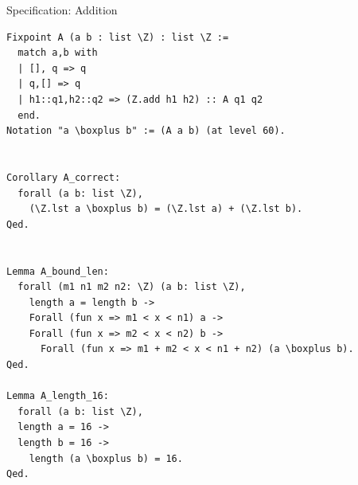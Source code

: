 \documentclass[8pt]{beamer}
\begin{document}
%
%

\begin{frame}[fragile]{Specification: Addition}
  \begin{center}
\begin{lstlisting}[language=Coq]
Fixpoint A (a b : list \Z) : list \Z :=
  match a,b with
  | [], q => q
  | q,[] => q
  | h1::q1,h2::q2 => (Z.add h1 h2) :: A q1 q2
  end.
Notation "a \boxplus b" := (A a b) (at level 60).


Corollary A_correct:
  forall (a b: list \Z),
    (\Z.lst a \boxplus b) = (\Z.lst a) + (\Z.lst b).
Qed.


Lemma A_bound_len:
  forall (m1 n1 m2 n2: \Z) (a b: list \Z),
    length a = length b ->
    Forall (fun x => m1 < x < n1) a ->
    Forall (fun x => m2 < x < n2) b ->
      Forall (fun x => m1 + m2 < x < n1 + n2) (a \boxplus b).
Qed.

Lemma A_length_16:
  forall (a b: list \Z),
  length a = 16 ->
  length b = 16 ->
    length (a \boxplus b) = 16.
Qed.
\end{lstlisting}

  \end{center}
\end{frame}
\end{document}
